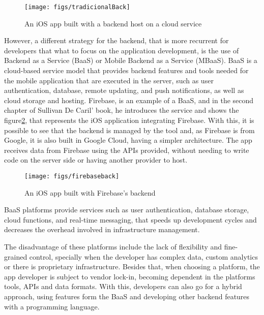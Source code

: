 \begin{figure}[h]
    \caption{An iOS app built with a backend host on a cloud service\cite{DeCarli2023}}
    \centering
    \texttt{[image: figs/tradicionalBack]}
    \label{fig:tradicionalBackend}
\end{figure}

However, a different strategy for the backend, that is more recurrent for developers that what to focus on the application development, is the use of Backend as a Service (BaaS) or Mobile Backend as a Service (MBaaS)\cite{inproceedings}.
BaaS is a cloud-based service model that provides backend features and tools needed for the mobile application that are executed in the server, such as user authentication, database, remote updating, and push notifications, as well as cloud storage and hosting\cite{saraf2022}.
Firebase\cite{firebaseGoogle}, is an example of a BaaS, and in the second chapter of Sullivan De Caril' book, he introduces the service and shows the figure\ref{fig:firebaseBack}, that represents the iOS application integrating Firebase.
With this, it is possible to see that the backend is managed by the tool and, as Firebase is from Google, it is also built in Google Cloud, having a simpler architecture.
The app receives data from Firebase using the APIs provided, without needing to write code on the server side or having another provider to host\cite{DeCarli2023}.


\begin{figure}[h]
    \caption{An iOS app built with Firebase’s backend\cite{DeCarli2023}}
    \centering
    \texttt{[image: figs/firebaseback]}
    \label{fig:firebaseBack}
\end{figure}


BaaS platforms provide services such as user  authentication,  database  storage,  cloud  functions,  and real-time  messaging, that speeds  up  development  cycles and   decreases   the   overhead   involved   in   infrastructure management\cite{Shah_Jagtap_Jain_2025}.

The disadvantage of these platforms include the lack of flexibility and fine-grained control, specially when the developer has complex data, custom analytics or there is proprietary infrastructure.
Besides that, when choosing a platform, the app developer is subject to vendor lock-in, becoming dependent in the platforms tools, APIs and data formats.
With this, developers can also go for a hybrid approach, using features form the BaaS and developing other backend features with a programming language\cite{Shah_Jagtap_Jain_2025}.


